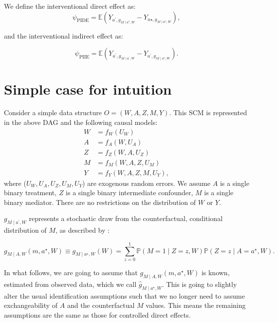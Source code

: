 \documentclass[
  12pt,
]{book}
\theoremstyle{definition}
\theoremstyle{definition}
\theoremstyle{definition}
\renewcommand{\P}{\mathbb{P}}
\newcommand{\E}{\mathbb{E}}
\newcommand{\1}{\mathbbm{1}}
\begin{document}
We define the interventional direct effect as:
\begin{equation*}
  \psi_{\text{PIDE}} = \E(Y_{a^\prime,g_{M \mid a^\star,W}} -
    Y_{a\star,g_{M \mid a^\star,W}}),
\end{equation*}

and the interventional indirect effect as:

\begin{equation*}
  \psi_{\text{PIIE}} = \E(Y_{a^\prime,g_{M \mid a^\prime,W}} -
    Y_{a^\prime,g_{M \mid a^\star,W}}).
\end{equation*}

\hypertarget{simple-case-for-intuition-1}{%
\section{Simple case for intuition}\label{simple-case-for-intuition-1}}

Consider a simple data structure \(O=(W, A, Z, M, Y)\). This SCM is represented in
the above DAG and the following causal models:
\begin{align*}
W & = f_W(U_W)\\
A & = f_A(W, U_A)\\
Z & = f_Z(W, A, U_Z)\\
M & = f_M(W, A, Z, U_M)\\
Y & = f_Y(W, A, Z, M, U_Y),
\end{align*}
where (\(U_W, U_A, U_Z, U_M, U_Y\)) are exogenous random errors. We assume \(A\) is
a single binary treatment, \(Z\) is a single binary intermediate confounder, \(M\)
is a single binary mediator. There are no restrictions on the distribution of
\(W\) or \(Y\).

\(g_{M \mid a^\prime,W}\) represents a stochastic draw from the counterfactual,
conditional distribution of \(M\), as described by
\citet{vanderweele2016mediation}:

\begin{equation*}
  g_{M \mid A,W}(m, a^{\star}, W) \equiv g_{M \mid a^{\star}, W}(W) =
    \sum_{z=0}^1 \P(M=1 \mid Z=z,W) \P(Z=z \mid A=a^{\star}, W).
\end{equation*}

In what follows, we are going to assume that \(g_{M \mid A,W}(m, a^{\star}, W)\)
is known, estimated from observed data, which we call
\(\hat{g}_{M \mid a^{\star}, W}\). This is going to slightly alter the usual
identification assumptions such that we no longer need to assume exchangeability
of \(A\) and the counterfactual \(M\) values. This means the remaining assumptions
are the same as those for controlled direct effects.
\end{document}
